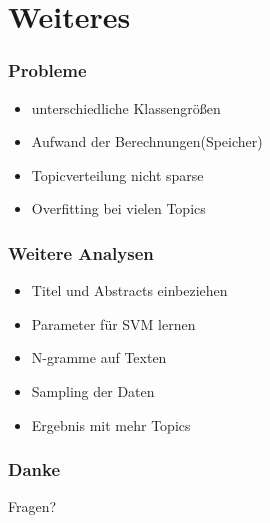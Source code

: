\documentclass[12pt, xcolor=table]{beamer}
\begin{document}


\section{Weiteres} %
\label{sec:Weiteres}

\begin{frame}
    \frametitle{Probleme}
    \begin{itemize}
        \item unterschiedliche Klassengrößen
        \item Aufwand der Berechnungen(Speicher)
        \item Topicverteilung nicht sparse
        \item Overfitting bei vielen Topics
    \end{itemize}
\end{frame}

\begin{frame}
    \frametitle{Weitere Analysen}
    \begin{itemize}
        \item Titel und Abstracts einbeziehen
        \item Parameter für SVM lernen
        \item N-gramme auf Texten
        \item Sampling der Daten
        \item Ergebnis mit mehr Topics
    \end{itemize}
\end{frame}

\begin{frame}
    \frametitle{Danke}
    \begin{block}{Fragen?}
    \end{block}
\end{frame}
\end{document}
